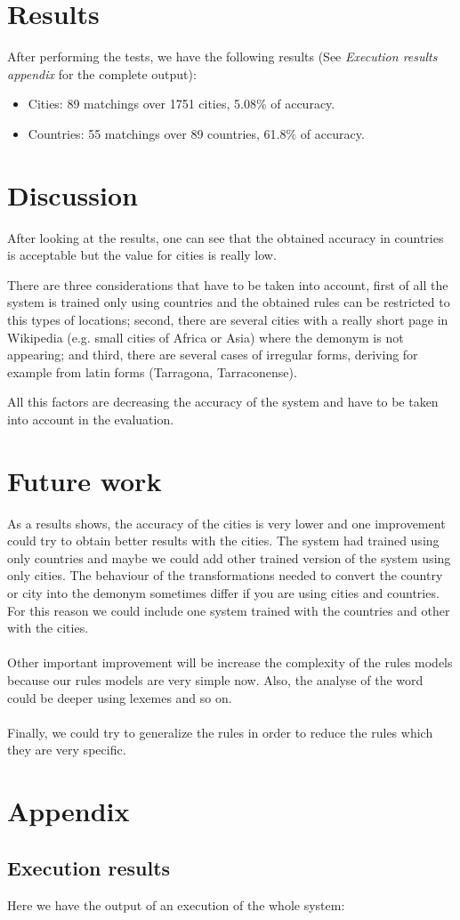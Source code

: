 \documentclass[]{report}
\begin{document}
\section{Results}

After performing the tests, we have the following results (See \textit{Execution results appendix} for the complete output):
\begin{itemize}
\item Cities: 89 matchings over 1751 cities, 5.08\% of accuracy.
\item Countries: 55 matchings over 89 countries, 61.8\% of accuracy.
\end{itemize}



\section{Discussion}

After looking at the results, one can see that the obtained accuracy in countries is acceptable but the value for cities is really low.

There are three considerations that have to be taken into account, first of all the system is trained only using countries and the obtained rules can be restricted to this types of locations; second, there are several cities with a really short page in Wikipedia (e.g. small cities of Africa or Asia) where the demonym is not appearing; and third, there are several cases of irregular forms, deriving for example from latin forms (Tarragona, Tarraconense).

All this factors are decreasing the accuracy of the system and have to be taken into account in the evaluation.


\section{Future work}

As a results shows, the accuracy of the cities is very lower and one improvement could try to obtain better results with the cities. The system had trained using only countries and maybe we could add other trained version of the system using only cities. The behaviour of the transformations needed to convert the country or city into the demonym sometimes differ if you are using cities and countries. For this reason we could include one system trained with the countries and other with the cities. 
\\\\
Other important improvement will be increase the complexity of the rules models because our rules models are very simple now. Also, the analyse of the word could be deeper using lexemes and so on.
\\\\
Finally, we could try to generalize the rules in order to reduce the rules which they are very specific.

\section*{Appendix}
\subsection*{Execution results}

Here we have the output of an execution of the whole system:


\end{document}
